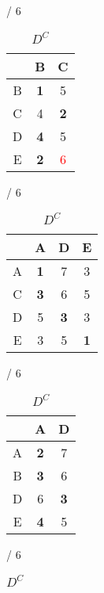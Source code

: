 \documentclass[a4paper, 11 pt, article, accentcolor=tud7b]{tudreport}
\begin{document}
  \begin{table}[h]
	  \begin{subtable}[b]{\textwidth / 6}
	    \begin{tabular}{| c | c | c |}
	      \hline
	        & B                   & C          \\ \hline
	      B & \textbf{1}          & 5          \\ \hline
	      C & 4                   & \textbf{2} \\ \hline
	      D & \textbf{4}          & 5          \\ \hline
	      E & \textbf{2}          & \textcolor{red}{6} \\ \hline
	    \end{tabular}
	    \caption{$D^{A}$}
	  \end{subtable}
	  \hfill
	  \begin{subtable}[b]{\textwidth / 6}
	    \begin{tabular}{| c | c | c | c |}
	    \hline
	      & A                   & D          & E                  \\ \hline
	    A & \textbf{1}          & 7          & 3                  \\ \hline
	    C & \textbf{3}          & 6          & 5                  \\ \hline
	    D & 5                   & \textbf{3} & 3                  \\ \hline
	    E & 3                   & 5          & \textbf{1}         \\ \hline
	    \end{tabular}
	    \caption{$D^{B}$}
	  \end{subtable}
	  \hfill
	  \begin{subtable}[b]{\textwidth / 6}
	    \begin{tabular}{| c | c | c |}
	    \hline
	      & A                   & D          \\ \hline
	    A & \textbf{2}          & 7          \\ \hline
	    B & \textbf{3}          & 6          \\ \hline
	    D & 6                   & \textbf{3} \\ \hline
	    E & \textbf{4}          & 5          \\ \hline
	    \end{tabular}
	    \caption{$D^{C}$}
	  \end{subtable}
    \hfill
	  \begin{subtable}[b]{\textwidth / 6}
	    \begin{tabular}{| c | c | c | c |}

\end{tabular}
\end{subtable}
\end{table}
\end{document}
